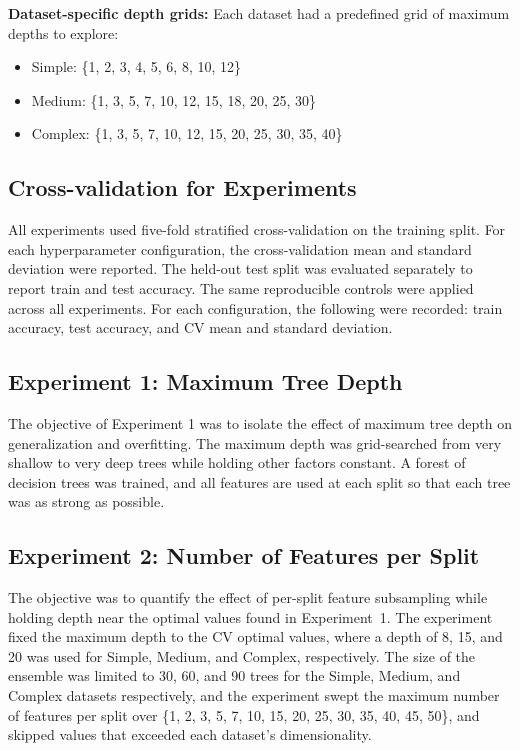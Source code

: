 \documentclass[conference]{IEEEtran}
\begin{document}
\textbf{Dataset-specific depth grids:} Each dataset had a predefined grid of maximum depths to explore:
\begin{itemize}
  \item Simple: \{1, 2, 3, 4, 5, 6, 8, 10, 12\}
  \item Medium: \{1, 3, 5, 7, 10, 12, 15, 18, 20, 25, 30\}
  \item Complex: \{1, 3, 5, 7, 10, 12, 15, 20, 25, 30, 35, 40\}
\end{itemize}

\subsection{Cross-validation for Experiments}
All experiments used five-fold stratified cross-validation on the training split. For each hyperparameter configuration, the cross-validation mean and standard deviation were reported. The held-out test split was evaluated separately to report train and test accuracy. The same reproducible controls were applied across all experiments. For each configuration, the following were recorded: train accuracy, test accuracy, and CV mean and standard deviation. 

\subsection{Experiment 1: Maximum Tree Depth}
The objective of Experiment 1 was to isolate the effect of maximum tree depth on generalization and overfitting. The maximum depth was grid-searched from very shallow to very deep trees while holding other factors constant. A forest of decision trees was trained, and all features are used at each split so that each tree was as strong as possible.

\subsection{Experiment 2: Number of Features per Split}
The objective was to quantify the effect of per-split feature subsampling while holding depth near the optimal values found in Experiment~1. The experiment fixed the maximum depth to the CV optimal values, where a depth of 8, 15, and 20 was used for Simple, Medium, and Complex, respectively. The size of the ensemble was limited to 30, 60, and 90 trees for the Simple, Medium, and Complex datasets respectively, and the experiment swept the maximum number of features per split over \{1, 2, 3, 5, 7, 10, 15, 20, 25, 30, 35, 40, 45, 50\}, and skipped values that exceeded each dataset's dimensionality.
\end{document}
